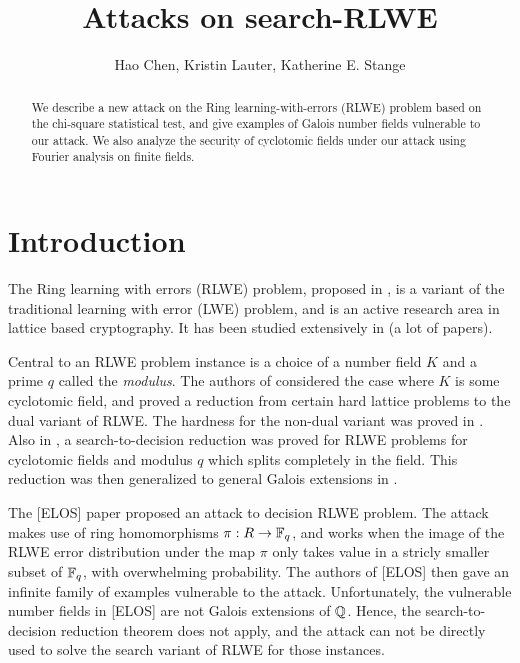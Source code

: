 \documentclass{amsart}
\title{Attacks on search-RLWE}
\author{Hao Chen, Kristin Lauter, Katherine E. Stange}
\begin{document}
\maketitle

\begin{abstract}
We describe a new attack on the Ring learning-with-errors (RLWE) problem based on the chi-square statistical test, and give examples of Galois number fields vulnerable to our attack. We also analyze the security of cyclotomic fields under our attack using Fourier analysis on finite fields.

\end{abstract}

\section{Introduction}
The Ring learning with errors (RLWE) problem, proposed in \cite{lyubashevsky2013ideal}, is a variant of the traditional learning with error (LWE) problem, and is an active research area in lattice based cryptography. It has been studied extensively in (a lot of papers).

Central to an RLWE problem instance is a choice of a number field $K$ and a prime $q$ called the {\it modulus}. The authors of \cite{lyubashevsky2013ideal} considered the case where $K$ is some cyclotomic field, and proved a reduction from certain hard lattice problems to the dual variant of RLWE. The hardness for the non-dual variant was proved in \cite{ducas2012ring}. Also in \cite{lyubashevsky2013ideal}, a search-to-decision reduction was proved for RLWE problems for cyclotomic fields and modulus $q$ which splits completely in the field. This reduction was then generalized to general Galois extensions in \cite{eisentrager2014weak}.

The [ELOS] paper proposed an attack to decision RLWE problem. The attack makes use of ring homomorphisms $\pi: R \to \mathbb{F}_q$, and works when the image of the RLWE error distribution under the map $\pi$ only takes value in a stricly smaller subset of $\mathbb{F}_q$, with overwhelming probability. The authors of [ELOS] then gave an infinite family of examples vulnerable to the attack. Unfortunately, the vulnerable number fields in [ELOS] are not Galois extensions of $\mathbb{Q}$. Hence, the search-to-decision reduction theorem does not apply, and the attack can not be directly used to solve the search variant of RLWE for those instances.
\end{document}
